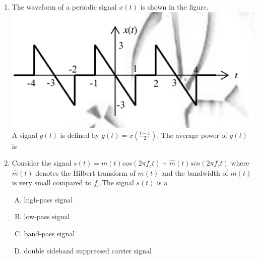 \documentclass[journal,12pt,twocolumn]{IEEEtran}
\begin{document}
\begin{enumerate}
\item The waveform of a periodic signal $x(t)$ is shown in the figure.\\
\includegraphics[scale=0.4]{fig14.eps}
\newline A signal $g(t)$ is defined by $g(t)=x(\frac{t-1}{2})$. The average power of $g(t)$ is \underline{\hspace{2cm}}\\


\item Consider the signal $s(t)=m(t)cos(2\pi f_c t)+\hat{m}(t)sin(2\pi f_c t)$ where $\hat{m}(t)$ denotes the Hilbert transform of $m(t)$ and the bandwidth of $m(t)$ is very small compared to $f_c$.The signal $s(t)$ is a

\begin{enumerate}[(A)]

\setlength\itemsep{2em}

\item high-pass signal
\item low-pass signal
\item band-pass signal
\item double sideband suppressed carrier signal
\end{enumerate}






\end{enumerate}
\end{document}
